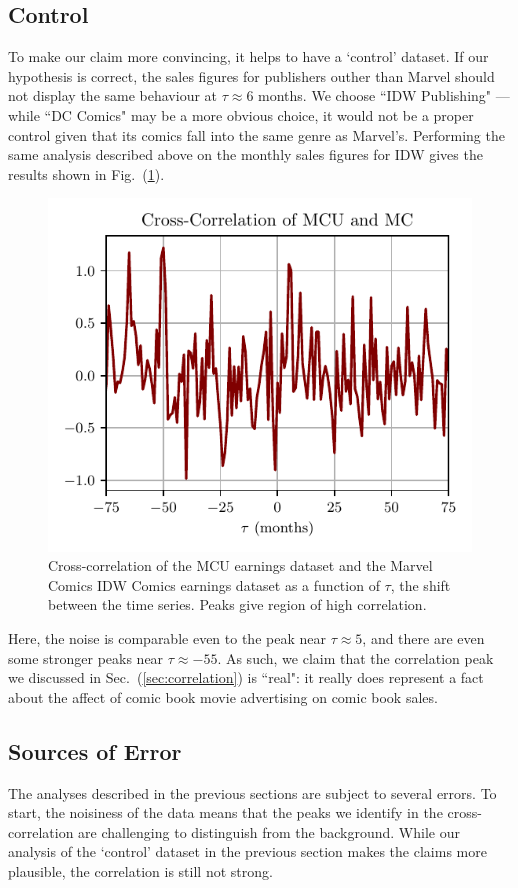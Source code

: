 \documentclass[12pt]{article}
\begin{document}
\subsection{Control}
To make our claim more convincing, it helps to have a `control' dataset.  If our hypothesis is correct, the sales figures for publishers outher than Marvel should not display the same behaviour at $\tau \approx 6$ months.  We choose ``IDW Publishing" --- while ``DC Comics"  may be a more obvious choice, it would not be a proper control given that its comics fall into the same genre as Marvel's.  Performing the same analysis described above on the monthly sales figures for IDW gives the results shown in Fig.~(\ref{fig:correlation2}).
\begin{figure}[h]
    \centering
    \includegraphics{figures/correlation2.pdf}
    \caption{Cross-correlation of the MCU earnings dataset and the Marvel Comics IDW Comics earnings dataset as a function of $\tau$, the shift between the time series.  Peaks give region of high correlation.}\label{fig:correlation2}
\end{figure}
Here, the noise is comparable even to the peak near $\tau \approx 5$, and there are even some stronger peaks near $\tau \approx -55$.  As such, we claim that the correlation peak we discussed in Sec.~(\ref{sec:correlation}) is ``real": it really does represent a fact about the affect of comic book movie advertising on comic book sales.

\subsection{Sources of Error}
\label{sec:sources_of_error}
The analyses described in the previous sections are subject to several errors.  To start, the noisiness of the data means that the peaks we identify in the cross-correlation are challenging to distinguish from the background.  While our analysis of the `control' dataset in the previous section makes the claims more plausible, the correlation is still not strong.
\end{document}
